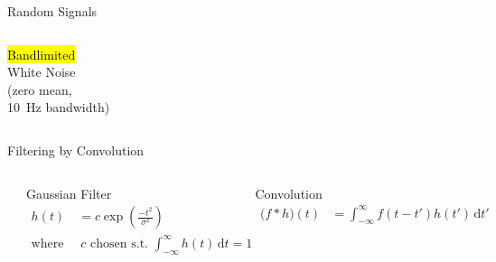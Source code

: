 \documentclass[handout,aspectratio=169]{beamer}
\begin{document}
\begin{frame}{Random Signals}
\begin{overlayarea}{\textwidth}{0.9\textheight}
{\begin{columns}
			\hl{Bandlimited}\\White Noise\\
			(zero mean,\\\SI{10}{\hertz} bandwidth)
			\end{columns}}
	\end{overlayarea}
\end{frame}

\begin{frame}{Filtering by Convolution}
	\begin{columns}
		\includegraphics[width=\textwidth]{media/gaussian_filters.pdf}
		\begin{block}{Gaussian Filter}
			\begin{align*}
				h(t) &= c \exp \left( \frac{-t^2}{\sigma^2} \right) \\
				\text{where }  &~c \text{ chosen s.t. } {\textstyle \int_{-\infty}^\infty h(t) \,\mathrm{d}t = 1}
			\end{align*}
		\end{block}
		\begin{block}{Convolution}
			\begin{align*}
				\big( f \ast h \big)(t) &= \int_{-\infty}^{\infty} f(t - t') h(t') \,\mathrm{d}t'
			\end{align*}
		\end{block}
	\end{columns}
\end{frame}
\end{document}
